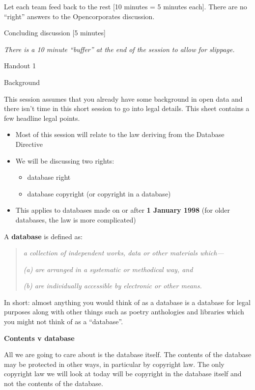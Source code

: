 Let each team feed back to the rest {[}10 minutes = 5 minutes each{]}.
There are no ``right'' answers to the Opencorporates discussion.

Concluding discussion {[}5 minutes{]}

\emph{There is a 10 minute ``buffer'' at the end of the session to allow
for slippage.}

Handout 1

Background

This session assumes that you already have some background in open data
and there isn't time in this short session to go into legal details.
This sheet contains a few headline legal points.

\begin{itemize}
\item
  Most of this session will relate to the law deriving from the Database
  Directive
\item
  We will be discussing two rights:

  \begin{itemize}
  \item
    database right
  \item
    database copyright (or copyright in a database)
  \end{itemize}
\item
  This applies to databases made on or after \textbf{1 January 1998}
  (for older databases, the law is more complicated)
\end{itemize}

A \textbf{database} is defined as:

\begin{quote}
\emph{a collection of independent works, data or other materials
which---}

\emph{(a) are arranged in a systematic or methodical way, and}

\emph{(b) are individually accessible by electronic or other means.}
\end{quote}

In short: almost anything you would think of as a database is a database
for legal purposes along with other things such as poetry anthologies
and libraries which you might not think of as a ``database''.

\textbf{Contents v database}

All we are going to care about is the database itself. The contents of
the database may be protected in other ways, in particular by copyright
law. The only copyright law we will look at today will be copyright in
the database itself and not the contents of the database.

